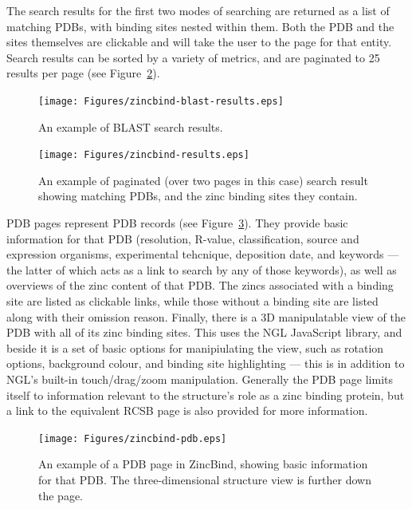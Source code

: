 The search results for the first two modes of searching are returned as a list of matching PDBs, with binding sites nested within them. Both the PDB and the sites themselves are clickable and will take the user to the page for that entity. Search results can be sorted by a variety of metrics, and are paginated to 25 results per page (see Figure~\ref{fig:zincbind-results}).

\begin{figure}
\centering
\texttt{[image: Figures/zincbind-blast-results.eps]}
\caption{\label{fig:zincbind-blast-results} An example of BLAST search results.}
\end{figure}

\begin{figure}
\centering
\texttt{[image: Figures/zincbind-results.eps]}
\caption[An example of paginated search results.]{\label{fig:zincbind-results} An example of paginated (over two pages
in this case) search result showing matching PDBs, and the zinc binding sites
they contain.}
\end{figure}

PDB pages represent PDB records (see Figure~\ref{fig:zincbind-pdb}). They provide basic information for that PDB (resolution, R-value, classification, source and expression organisms, experimental tehcnique, deposition date, and keywords --- the latter of which acts as a link to search by any of those keywords), as well as overviews of the zinc content of that PDB. The zincs associated with a binding site are listed as clickable links, while those without a binding site are listed along with their omission reason. Finally, there is a 3D manipulatable view of the PDB with all of its zinc binding sites. This uses the NGL JavaScript library, and beside it is a set of basic options for manipiulating the view, such as rotation options, background colour, and binding site highlighting --- this is in addition to NGL's built-in touch/drag/zoom manipulation. Generally the PDB page limits itself to information relevant to the structure's role as a zinc binding protein, but a link to the equivalent RCSB page is also provided for more information.

\begin{figure}
\centering
\texttt{[image: Figures/zincbind-pdb.eps]}
\caption{\label{fig:zincbind-pdb} An example of a PDB page in ZincBind, showing basic
information for that PDB. The three-dimensional structure view is further down the page.}
\end{figure}

